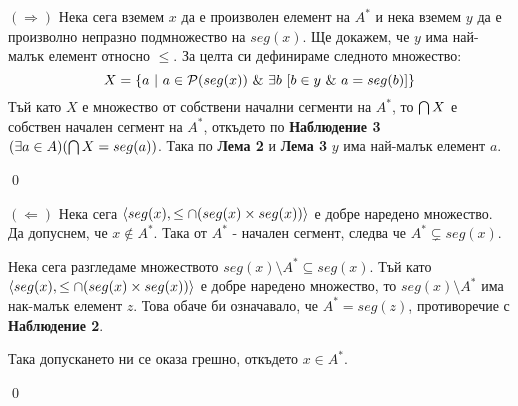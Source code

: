 \quad
$(\Rightarrow)$
Нека сега вземем $x$ да е произволен елемент на $A^*$
и нека вземем $y$ да е произволно непразно подмножество на $seg(x)$.
Ще докажем, че $y$ има най-малък елемент относно $\leq$.
За целта си дефинираме следното множество:
\[
X = \{ a\ |\ a \in \pow(seg(x)) \land \exists b\ [ b \in y \land  a = seg(b)] \}
\]
\quad
Тъй като $X$ е множество от собствени начални сегменти на $A^*$, то $\bigcap X$ е собствен начален сегмент на $A^*$,
откъдето по \textbf{Наблюдение 3}
$(\exists a \in A)(\bigcap X = seg(a))$.
Така по \textbf{Лема 2} и \textbf{Лема 3} $y$ има най-малък елемент $a$.

\qed

\quad
$(\Leftarrow)$ Нека сега
$\langle seg(x), \leq \cap (seg(x) \times seg(x)) \rangle$
е добре наредено множество.
Да допуснем, че $x \notin A^*$.
Така от $A^*$ - начален сегмент, следва че $A^* \subsetneq seg(x)$.

\quad
Нека сега разгледаме множеството $seg(x) \setminus A^* \subseteq seg(x)$.
Тъй като
$\langle seg(x), \leq \cap (seg(x) \times seg(x)) \rangle$
е добре наредено множество, то $seg(x) \setminus A^*$ има нак-малък елемент $z$.
Това обаче би означавало, че $A^* = seg(z)$, противоречие с \textbf{Наблюдение 2}.

\quad
Така допускането ни се оказа грешно, откъдето $x \in A^*$.

\qed
